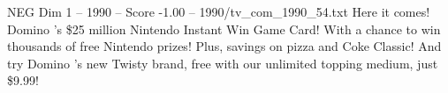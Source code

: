 \begin{textsample}{NEG Dim 1 – 1990 – Score -1.00 – 1990/tv\_com\_1990\_54.txt}  \label{ex:f1_neg_046}
Here it comes!
Domino 's \$25 million Nintendo Instant Win Game Card!
With a chance to win thousands of free Nintendo prizes!
Plus, savings on pizza and Coke Classic!
And try Domino 's new Twisty brand, free with our unlimited topping medium, just \$9.99!

\end{textsample}

